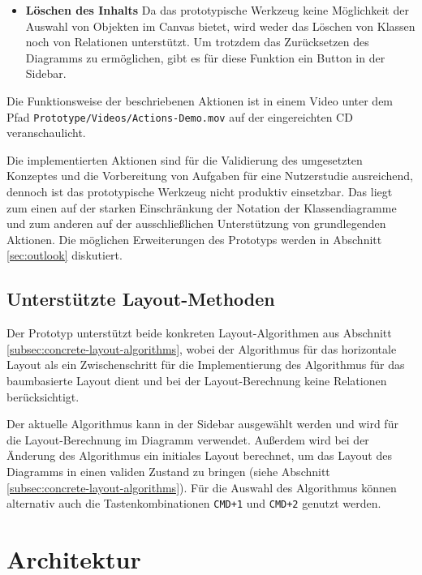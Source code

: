 \begin{itemize}
\item
\textbf{Löschen des Inhalts}
Da das prototypische Werkzeug keine Möglichkeit der Auswahl von Objekten im Canvas bietet, wird weder das Löschen von Klassen noch von Relationen unterstützt. Um trotzdem das Zurücksetzen des Diagramms zu ermöglichen, gibt es für diese Funktion ein Button in der Sidebar.

\end{itemize}

Die Funktionsweise der beschriebenen Aktionen ist in einem Video unter dem Pfad \texttt{Proto\-type/Videos/Actions-Demo.mov} auf der eingereichten CD veranschaulicht.

Die implementierten Aktionen sind für die Validierung des umgesetzten Konzeptes und die Vorbereitung von Aufgaben für eine Nutzerstudie ausreichend, dennoch ist das prototypische Werkzeug nicht produktiv einsetzbar. Das liegt zum einen auf der starken Einschränkung der Notation der Klassendiagramme und zum anderen auf der ausschließlichen Unterstützung von grundlegenden Aktionen. Die möglichen Erweiterungen des Prototyps werden in Abschnitt \ref{sec:outlook} diskutiert.

\subsection{Unterstützte Layout-Methoden}
\label{subsec:supported-layout-methods}

Der Prototyp unterstützt beide konkreten Layout-Algorithmen aus Abschnitt \ref{subsec:concrete-layout-algorithms}, wobei der Algorithmus für das horizontale Layout als ein Zwischenschritt für die Implementierung des Algorithmus für das baumbasierte Layout dient und bei der Layout-Berechnung keine Relationen berücksichtigt.

Der aktuelle Algorithmus kann in der Sidebar ausgewählt werden und wird für die Layout-Berechnung im Diagramm verwendet. Außerdem wird bei der Änderung des Algorithmus ein initiales Layout berechnet, um das Layout des Diagramms in einen validen Zustand zu bringen (siehe Abschnitt \ref{subsec:concrete-layout-algorithms}). Für die Auswahl des Algorithmus können alternativ auch die Tastenkombinationen \texttt{CMD+1} und \texttt{CMD+2} genutzt werden.

\section{Architektur}
\label{sec:architecture}

